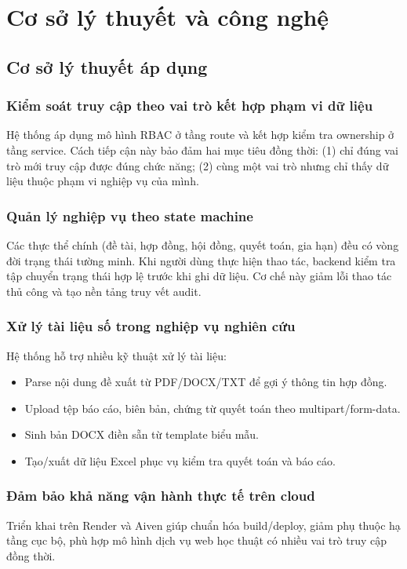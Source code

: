 \documentclass[12pt,a4paper]{report}
\begin{document}
\chapter{Cơ sở lý thuyết và công nghệ}

\section{Cơ sở lý thuyết áp dụng}
\subsection{Kiểm soát truy cập theo vai trò kết hợp phạm vi dữ liệu}
Hệ thống áp dụng mô hình RBAC ở tầng route và kết hợp kiểm tra ownership ở tầng service. Cách tiếp cận này bảo đảm hai mục tiêu đồng thời: (1) chỉ đúng vai trò mới truy cập được đúng chức năng; (2) cùng một vai trò nhưng chỉ thấy dữ liệu thuộc phạm vi nghiệp vụ của mình.

\subsection{Quản lý nghiệp vụ theo state machine}
Các thực thể chính (đề tài, hợp đồng, hội đồng, quyết toán, gia hạn) đều có vòng đời trạng thái tường minh. Khi người dùng thực hiện thao tác, backend kiểm tra tập chuyển trạng thái hợp lệ trước khi ghi dữ liệu. Cơ chế này giảm lỗi thao tác thủ công và tạo nền tảng truy vết audit.

\subsection{Xử lý tài liệu số trong nghiệp vụ nghiên cứu}
Hệ thống hỗ trợ nhiều kỹ thuật xử lý tài liệu:
\begin{itemize}[leftmargin=1.2cm]
\item Parse nội dung đề xuất từ PDF/DOCX/TXT để gợi ý thông tin hợp đồng.
\item Upload tệp báo cáo, biên bản, chứng từ quyết toán theo multipart/form-data.
\item Sinh bản DOCX điền sẵn từ template biểu mẫu.
\item Tạo/xuất dữ liệu Excel phục vụ kiểm tra quyết toán và báo cáo.
\end{itemize}

\subsection{Đảm bảo khả năng vận hành thực tế trên cloud}
Triển khai trên Render và Aiven giúp chuẩn hóa build/deploy, giảm phụ thuộc hạ tầng cục bộ, phù hợp mô hình dịch vụ web học thuật có nhiều vai trò truy cập đồng thời.
\end{document}
